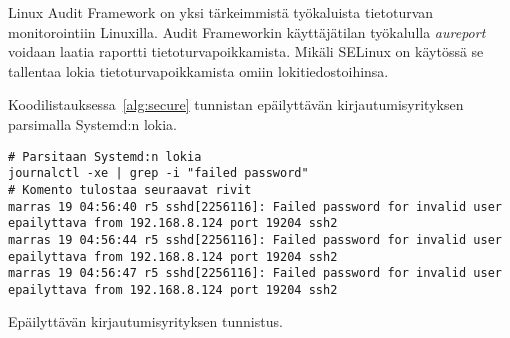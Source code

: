 Linux Audit Framework on yksi tärkeimmistä työkaluista tietoturvan monitorointiin Linuxilla. Audit Frameworkin käyttäjätilan työkalulla \textit{aureport} voidaan laatia raportti tietoturvapoikkamista. Mikäli SELinux on käytössä se tallentaa lokia tietoturvapoikkamista omiin lokitiedostoihinsa.~\cite{xplg}

Koodilistauksessa~\ref{alg:secure} tunnistan epäilyttävän kirjautumisyrityksen parsimalla Systemd:n lokia.

\begin{algorithm}[tbh]
\begin{verbatim}
# Parsitaan Systemd:n lokia
journalctl -xe | grep -i "failed password"
# Komento tulostaa seuraavat rivit
marras 19 04:56:40 r5 sshd[2256116]: Failed password for invalid user
epailyttava from 192.168.8.124 port 19204 ssh2
marras 19 04:56:44 r5 sshd[2256116]: Failed password for invalid user
epailyttava from 192.168.8.124 port 19204 ssh2
marras 19 04:56:47 r5 sshd[2256116]: Failed password for invalid user
epailyttava from 192.168.8.124 port 19204 ssh2
\end{verbatim}
\caption{Epäilyttävän kirjautumisyrityksen tunnistus.\label{alg:secure}}
\end{algorithm}
